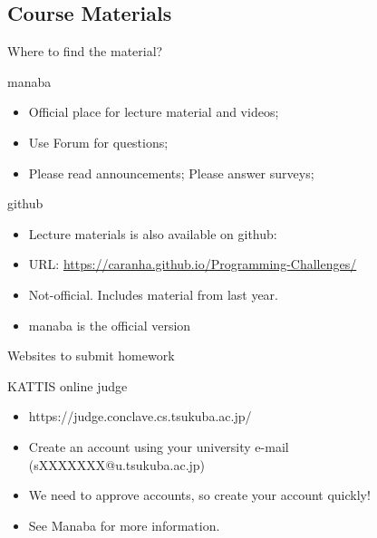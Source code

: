 \subsection{Course Materials}
\begin{frame}{Where to find the material?}
  \begin{block}{manaba}
    \begin{itemize}
      \item Official place for lecture material and videos;
      \item Use Forum for questions;
      \item Please read announcements; Please answer surveys;
    \end{itemize}
  \end{block}
  \begin{block}{github}
    \begin{itemize}
      \item Lecture materials is also available on github:
      \item URL: \url{https://caranha.github.io/Programming-Challenges/}
      \item Not-official. Includes material from last year.
      \item manaba is the official version
    \end{itemize}
  \end{block}
\end{frame}


\begin{frame}{Websites to submit homework}
  \begin{block}{KATTIS online judge}
    \begin{itemize}
      \item https://judge.conclave.cs.tsukuba.ac.jp/
        \medskip
        
      \item Create an account using your university e-mail (sXXXXXXX@u.tsukuba.ac.jp)
        \medskip

      \item We need to approve accounts, so create your account quickly!
        \medskip
        
      \item See Manaba for more information.
    \end{itemize}
  \end{block}
\end{frame}

